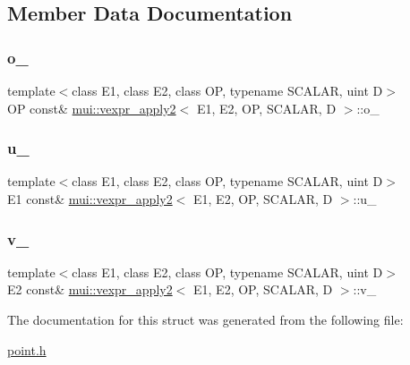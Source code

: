 \subsection{Member Data Documentation}
\mbox{\label{structmui_1_1vexpr__apply2_ab9ed807ceb0ca2e653322335e107993c}} 
\subsubsection{\texorpdfstring{o\+\_\+}{o\_}}
{\footnotesize\ttfamily template$<$class E1, class E2, class OP, typename S\+C\+A\+L\+AR, uint D$>$ \\
OP const\& \hyperlink{structmui_1_1vexpr__apply2}{mui\+::vexpr\+\_\+apply2}$<$ E1, E2, OP, S\+C\+A\+L\+AR, D $>$\+::o\+\_\+\hspace{0.3cm}{\ttfamily [protected]}}

\mbox{\label{structmui_1_1vexpr__apply2_ae4516b6d3f2cabd1e3df08094237d0cf}} 
\subsubsection{\texorpdfstring{u\+\_\+}{u\_}}
{\footnotesize\ttfamily template$<$class E1, class E2, class OP, typename S\+C\+A\+L\+AR, uint D$>$ \\
E1 const\& \hyperlink{structmui_1_1vexpr__apply2}{mui\+::vexpr\+\_\+apply2}$<$ E1, E2, OP, S\+C\+A\+L\+AR, D $>$\+::u\+\_\+\hspace{0.3cm}{\ttfamily [protected]}}

\mbox{\label{structmui_1_1vexpr__apply2_a57433c09c10b560ce23a382fc49761fc}} 
\subsubsection{\texorpdfstring{v\+\_\+}{v\_}}
{\footnotesize\ttfamily template$<$class E1, class E2, class OP, typename S\+C\+A\+L\+AR, uint D$>$ \\
E2 const\& \hyperlink{structmui_1_1vexpr__apply2}{mui\+::vexpr\+\_\+apply2}$<$ E1, E2, OP, S\+C\+A\+L\+AR, D $>$\+::v\+\_\+\hspace{0.3cm}{\ttfamily [protected]}}



The documentation for this struct was generated from the following file\+:\begin{DoxyCompactItemize}
\item 
\hyperlink{point_8h}{point.\+h}\end{DoxyCompactItemize}
